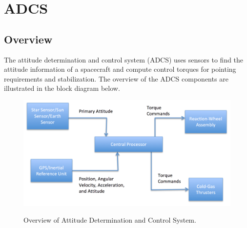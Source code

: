 \documentclass[paper=letter, fontsize=11pt]{scrartcl} %
\numberwithin{equation}{section} %
\numberwithin{figure}{section} %
\numberwithin{table}{section} %
\begin{document}
\section{ADCS}
\subsection {Overview}
The attitude determination and control system (ADCS) uses sensors to find the attitude information of a spacecraft and compute control torques for pointing requirements and stabilization. The overview of the ADCS components are illustrated in the block diagram below.
\begin{figure}[H]
\centering
\includegraphics[width=1\textwidth]{GNCHardware.png}
\label{fig:adcs}
\caption{Overview of Attitude Determination and Control System.}
\end{figure}
\end{document}
